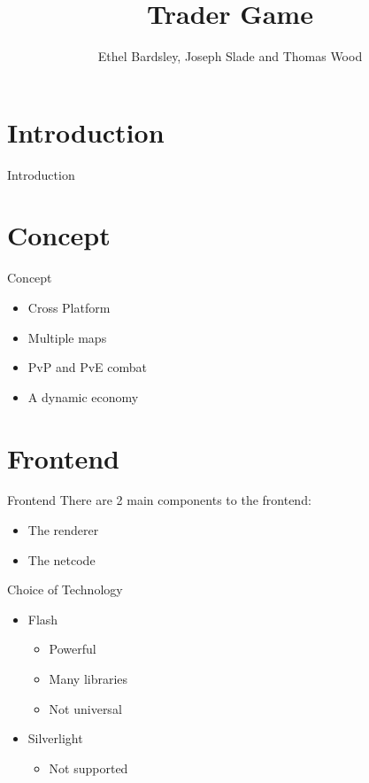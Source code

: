 
\usepackage{algorithm2e}
\usepackage{graphicx}
\usepackage[parfill]{parskip}
\usepackage{appendix}
\usepackage{amsmath}
\usepackage{multicol}

\title{Trader Game}
\author{Ethel Bardsley, Joseph Slade and Thomas Wood}



\begin{frame}
  \titlepage
\end{frame}

\section{Introduction}
\begin{frame}{Introduction}
\end{frame}

\section{Concept}
\begin{frame}{Concept}
  \begin{itemize}
    \item Cross Platform
    \item Multiple maps
    \item PvP and PvE combat
    \item A dynamic economy
  \end{itemize}
\end{frame}

\section{Frontend}
\begin{frame}{Frontend}
  There are 2 main components to the frontend:
  \begin{itemize}
    \item The renderer
    \item The netcode
  \end{itemize}
\end{frame}

\begin{frame}{Choice of Technology}
  \begin{itemize}
    \item Flash
      \begin{itemize}
        \item Powerful
        \item Many libraries
        \item Not universal
      \end{itemize}
    \item Silverlight
      \begin{itemize}
        \item Not supported
      \end{itemize}
  \end{itemize}
\end{frame}

